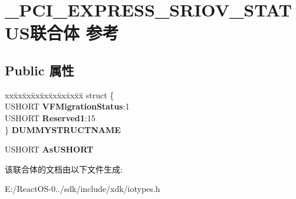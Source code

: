 \hypertarget{union___p_c_i___e_x_p_r_e_s_s___s_r_i_o_v___s_t_a_t_u_s}{}\section{\+\_\+\+P\+C\+I\+\_\+\+E\+X\+P\+R\+E\+S\+S\+\_\+\+S\+R\+I\+O\+V\+\_\+\+S\+T\+A\+T\+U\+S联合体 参考}
\label{union___p_c_i___e_x_p_r_e_s_s___s_r_i_o_v___s_t_a_t_u_s}
\subsection*{Public 属性}
\begin{DoxyCompactItemize}
\item 
\mbox{\label{union___p_c_i___e_x_p_r_e_s_s___s_r_i_o_v___s_t_a_t_u_s_ab9942d92c00ce173f3fb33caae3a7e3d}} 
\begin{tabbing}
xx\=xx\=xx\=xx\=xx\=xx\=xx\=xx\=xx\=\kill
struct \{\\
\>USHORT {\bfseries VFMigrationStatus}:1\\
\>USHORT {\bfseries Reserved1}:15\\
\} {\bfseries DUMMYSTRUCTNAME}\\

\end{tabbing}\item 
\mbox{\label{union___p_c_i___e_x_p_r_e_s_s___s_r_i_o_v___s_t_a_t_u_s_a1d78dec1aa966c1c1bef840aeaa7b705}} 
U\+S\+H\+O\+RT {\bfseries As\+U\+S\+H\+O\+RT}
\end{DoxyCompactItemize}


该联合体的文档由以下文件生成\+:\begin{DoxyCompactItemize}
\item 
E\+:/\+React\+O\+S-\/0../sdk/include/xdk/iotypes.\+h\end{DoxyCompactItemize}
